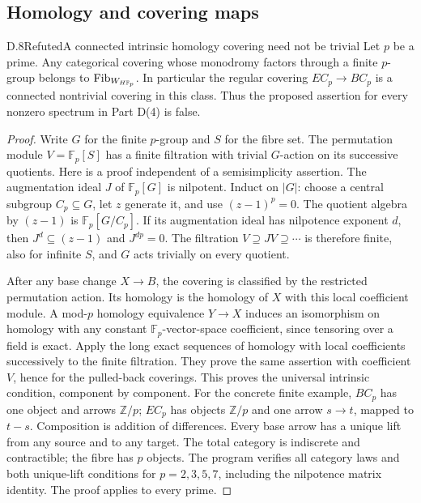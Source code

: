 \subsection{Homology and covering maps}
\begin{claim}{D.8}{Refuted}{A connected intrinsic homology covering need not be trivial}
Let $p$ be a prime. Any categorical covering whose monodromy factors through a finite $p$-group belongs to $\mathrm{Fib}_{W_{H\mathbb F_p}}$. In particular the regular covering $EC_p\to BC_p$ is a connected nontrivial covering in this class. Thus the proposed assertion for every nonzero spectrum in Part D(4) is false.
\end{claim}
\begin{proof}
Write $G$ for the finite $p$-group and $S$ for the fibre set. The permutation module $V=\mathbb F_p[S]$ has a finite filtration with trivial $G$-action on its successive quotients. Here is a proof independent of a semisimplicity assertion. The augmentation ideal $J$ of $\mathbb F_p[G]$ is nilpotent. Induct on $|G|$: choose a central subgroup $C_p\subseteq G$, let $z$ generate it, and use $(z-1)^p=0$. The quotient algebra by $(z-1)$ is $\mathbb F_p[G/C_p]$. If its augmentation ideal has nilpotence exponent $d$, then $J^d\subseteq(z-1)$ and $J^{dp}=0$. The filtration $V\supseteq JV\supseteq\cdots$ is therefore finite, also for infinite $S$, and $G$ acts trivially on every quotient.

After any base change $X\to B$, the covering is classified by the restricted permutation action. Its homology is the homology of $X$ with this local coefficient module. A mod-$p$ homology equivalence $Y\to X$ induces an isomorphism on homology with any constant $\mathbb F_p$-vector-space coefficient, since tensoring over a field is exact. Apply the long exact sequences of homology with local coefficients successively to the finite filtration. They prove the same assertion with coefficient $V$, hence for the pulled-back coverings. This proves the universal intrinsic condition, component by component.
For the concrete finite example, $BC_p$ has one object and arrows $\mathbb Z/p$; $EC_p$ has objects $\mathbb Z/p$ and one arrow $s\to t$, mapped to $t-s$. Composition is addition of differences. Every base arrow has a unique lift from any source and to any target. The total category is indiscrete and contractible; the fibre has $p$ objects. The program verifies all category laws and both unique-lift conditions for $p=2,3,5,7$, including the nilpotence matrix identity. The proof applies to every prime.
\end{proof}

